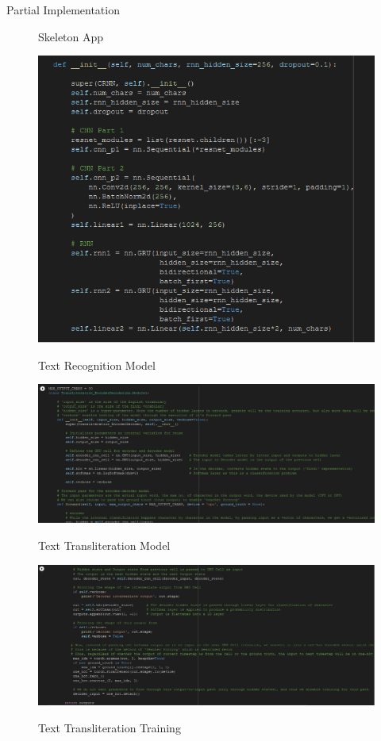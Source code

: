 \documentclass{beamer}
\begin{document}
\begin{frame}[allowframebreaks]{Partial Implementation}
\begin{figure}
\begin{subfigure}[b]{0.2\linewidth}
			\label{App}
           \end{subfigure}
	\caption{Skeleton App}
	\end{figure}
	\framebreak
	\begin{figure}
				{\includegraphics[scale=.3]{Recog_Model_1}}
				\caption{Text Recognition Model}
				\label{Recog_Model_1}
	\end{figure}
	\begin{figure}
				{\includegraphics[scale=.3]{Translit_Model_1}}
				\caption{Text Transliteration Model}
				\label{Translit_Model_1}
	\end{figure}
	\begin{figure}
				{\includegraphics[scale=.3]{Translit_Model_2}}
				\caption{Text Transliteration Training}
				\label{Translit_Model_1}
	\end{figure}
\end{frame}
\end{document}
